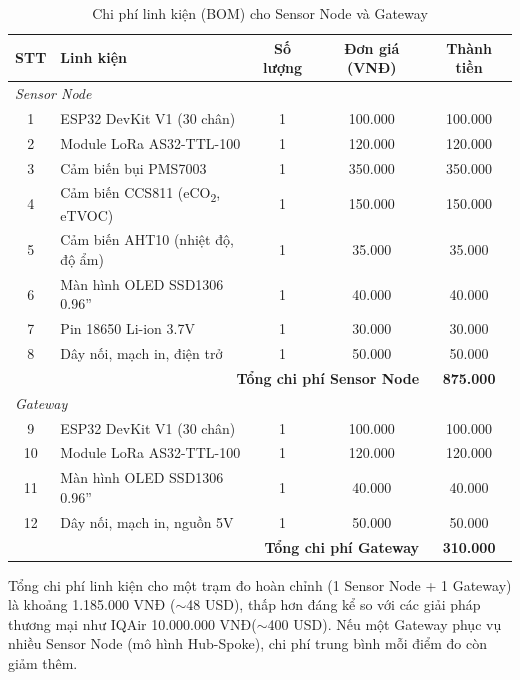 \documentclass[../DoAn.tex]{subfiles}
\begin{document}
\begin{table}[H]
\centering
\caption{Chi phí linh kiện (BOM) cho Sensor Node và Gateway}
\label{table:bom_cost}
\small
\begin{tabularx}{\textwidth}{|c|X|c|c|c|}
\hline
\textbf{STT} & \textbf{Linh kiện} & \textbf{Số lượng} & \textbf{Đơn giá (VNĐ)} & \textbf{Thành tiền} \\
\hline
\multicolumn{5}{|l|}{\textit{Sensor Node}} \\
\hline
1 & ESP32 DevKit V1 (30 chân) & 1 & 100.000 & 100.000 \\
\hline
2 & Module LoRa AS32-TTL-100 & 1 & 120.000 & 120.000 \\
\hline
3 & Cảm biến bụi PMS7003 & 1 & 350.000 & 350.000 \\
\hline
4 & Cảm biến CCS811 (eCO\textsubscript{2}, eTVOC) & 1 & 150.000 & 150.000 \\
\hline
5 & Cảm biến AHT10 (nhiệt độ, độ ẩm) & 1 & 35.000 & 35.000 \\
\hline
6 & Màn hình OLED SSD1306 0.96'' & 1 & 40.000 & 40.000 \\
\hline
7 & Pin 18650 Li-ion 3.7V & 1 & 30.000 & 30.000 \\
\hline
8 & Dây nối, mạch in, điện trở & 1 & 50.000 & 50.000 \\
\hline
\multicolumn{4}{|r|}{\textbf{Tổng chi phí Sensor Node}} & \textbf{875.000} \\
\hline
\multicolumn{5}{|l|}{\textit{Gateway}} \\
\hline
9 & ESP32 DevKit V1 (30 chân) & 1 & 100.000 & 100.000 \\
\hline
10 & Module LoRa AS32-TTL-100 & 1 & 120.000 & 120.000 \\
\hline
11 & Màn hình OLED SSD1306 0.96'' & 1 & 40.000 & 40.000 \\
\hline
12 & Dây nối, mạch in, nguồn 5V & 1 & 50.000 & 50.000 \\
\hline
\multicolumn{4}{|r|}{\textbf{Tổng chi phí Gateway}} & \textbf{310.000} \\
\hline
\end{tabularx}
\end{table}

Tổng chi phí linh kiện cho một trạm đo hoàn chỉnh (1 Sensor Node + 1 Gateway) là khoảng 1.185.000 VNĐ ($\sim$48 USD), thấp hơn đáng kể so với các giải pháp thương mại như IQAir 10.000.000 VNĐ($\sim$400 USD). Nếu một Gateway phục vụ nhiều Sensor Node (mô hình Hub-Spoke), chi phí trung bình mỗi điểm đo còn giảm thêm.
\end{document}
